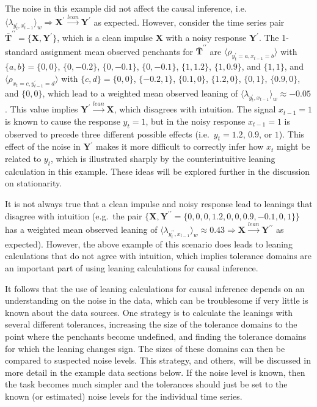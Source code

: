 \documentclass[a4paper,11pt,twocolumn]{article}
\begin{document}
The noise in this example did not affect the causal inference, i.e.\ $\langle \lambda_{y_t^\prime,x_{t-1}^\prime} \rangle_w \Rightarrow \mathbf{X}^\prime\xrightarrow{lean}\mathbf{Y}^\prime$ as expected.  However, consider the time series pair $\bar{\mathbf{T}}^{\prime\prime}=\{\mathbf{X},\mathbf{Y}^\prime\}$, which is a clean impulse $\mathbf{X}$ with a noisy response $\mathbf{Y}^\prime$. The 1-standard assignment mean observed penchants for $\bar{\mathbf{T}}^{\prime\prime}$ are $\langle \rho_{y_t^\prime=a,x_{t-1}=b} \rangle$ with $\{a,b\} = \{0,0\}$, $\{0,-0.2\}$, $\{0,-0.1\}$, $\{0,-0.1\}$, $\{1,1.2\}$, $\{1,0.9\}$, and $\{1,1\}$, and $\langle \rho_{x_t=c,y_{t-1}^\prime=d} \rangle$ with $\{c,d\} = \{0,0\}$, $\{-0.2,1\}$, $\{0.1,0\}$, $\{1.2,0\}$, $\{0,1\}$, $\{0.9,0\}$, and $\{0,0\}$, which lead to a weighted mean observed leaning of $\langle \lambda_{y_t^\prime,x_{t-1}} \rangle_w \approx -0.05$.  This value implies $\mathbf{Y}^\prime\xrightarrow{lean}\mathbf{X}$, which disagrees with intuition.  The signal $x_{t-1} = 1$ is known to cause the response $y_t=1$, but in the noisy response $x_{t-1}=1$ is observed to precede three different possible effects (i.e.\ $y_t = 1.2$, $0.9$, or $1$).  This effect of the noise in $\mathbf{Y}^\prime$ makes it more difficult to correctly infer how $x_t$ might be related to $y_t$, which is illustrated sharply by the counterintuitive leaning calculation in this example.  These ideas will be explored further in the discussion on stationarity.

It is not always true that a clean impulse and noisy response lead to leanings that disagree with intuition (e.g.\ the pair $\{\mathbf{X},\mathbf{Y}^{\prime\prime} = \{0,0,0,1.2,0,0,0.9,-0.1,0,1\}\}$ has a weighted mean observed leaning of $\langle \lambda_{y_t^{\prime\prime},x_{t-1}} \rangle_w \approx 0.43 \Rightarrow \mathbf{X}\xrightarrow{lean}\mathbf{Y}^{\prime\prime}$ as expected).  However, the above example of this scenario does leads to leaning calculations that do not agree with intuition, which implies tolerance domains are an important part of using leaning calculations for causal inference.  

It follows that the use of leaning calculations for causal inference depends on an understanding on the noise in the data, which can be troublesome if very little is known about the data sources.  One strategy is to calculate the leanings with several different tolerances, increasing the size of the tolerance domains to the point where the penchants become undefined, and finding the tolerance domains for which the leaning changes sign.  The sizes of these domains can then be compared to suspected noise levels.  This strategy, and others, will be discussed in more detail in the example data sections below.  If the noise level is known, then the task becomes much simpler and the tolerances should just be set to the known (or estimated) noise levels for the individual time series.
\end{document}
